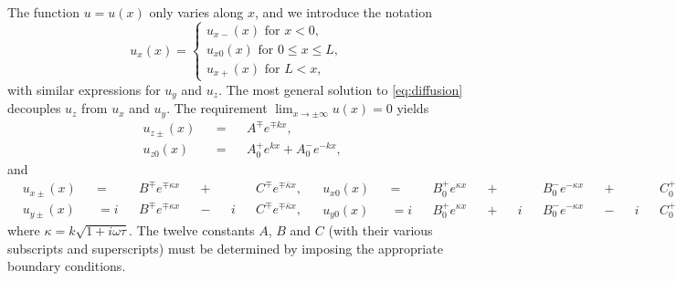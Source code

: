 The function $u = u(x)$ only varies along $x$,
and we introduce the notation
\begin{equation}
  u_x (x)
  =
  \begin{cases}
    u_{x-} (x) \text{~for~} x < 0, \\
    u_{x0} (x) \text{~for~} 0 ≤ x ≤ L, \\
    u_{x+} (x) \text{~for~}     L < x,
  \end{cases}
\end{equation}
with similar expressions for $u_y$ and $u_z$.
The most general solution to \cref{eq:diffusion}
decouples $u_z$ from $u_x$ and $u_y$.
The requirement $\lim_{x → ± ∞} u(x) = 0$ yields
\begin{subequations}
  \begin{alignat}{3}
    & u_{z±} (x) && {}={} && A^∓ e^{∓ k x}, \\
    & u_{z0} (x) && {}={} && A_0^+ e^{k x} {}+{} A_0^- e^{-k x},
  \end{alignat}
\end{subequations}
and
\begin{subequations}
  \begin{alignat}{6}
    & u_{x±} (x) && =   && B^∓ e^{∓ κ x} && {}+{} &&   && C^∓ e^{∓ \bar{κ} x},
    \\
    & u_{y±} (x) && = i && B^∓ e^{∓ κ x} && {}-{} && i && C^∓ e^{∓ \bar{κ} x},
  \end{alignat}
  \begin{alignat}{12}
    & u_{x0} (x) &&
    = && B_0^+ e^{κ x} && {}+{} &&   && B_0^- e^{- κ x} && {}+{} &&
      && C_0^+ e^{\bar{κ} x} && {}+{} &&   && C_0^- e^{- \bar{κ} x}, \\
    & u_{y0} (x) &&
    = i && B_0^+ e^{κ x} && {}+{} && i && B_0^- e^{- κ x} && {}-{} && i
      && C_0^+ e^{\bar{κ} x} && {}-{} && i && C_0^- e^{- \bar{κ} x},
  \end{alignat}
\end{subequations}
where $κ = k \sqrt{1 + i ω τ}$.
The twelve constants $A$, $B$ and $C$
(with their various subscripts and superscripts)
must be determined by imposing the appropriate boundary conditions.

